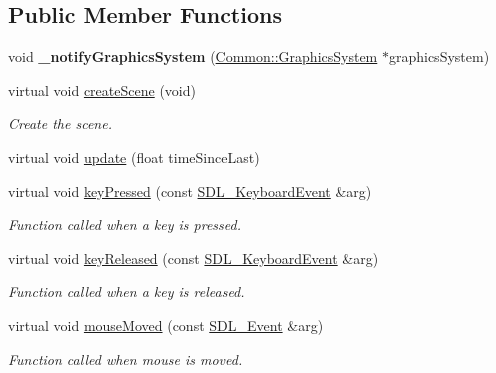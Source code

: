 \subsection*{Public Member Functions}
\begin{DoxyCompactItemize}
\item 
\mbox{\label{class_graphics_game_state_a0e81886306b906569add56b43e8da91d}} 
void {\bfseries \+\_\+notify\+Graphics\+System} (\hyperlink{class_common_1_1_graphics_system}{Common\+::\+Graphics\+System} $\ast$graphics\+System)
\item 
\mbox{\label{class_graphics_game_state_af8e2cd857387dd301edc894bfb8a7ac5}} 
virtual void \hyperlink{class_graphics_game_state_af8e2cd857387dd301edc894bfb8a7ac5}{create\+Scene} (void)
\begin{DoxyCompactList}\small\item\em Create the scene. \end{DoxyCompactList}\item 
virtual void \hyperlink{class_graphics_game_state_a5a2543a4cdd551c98f4540707bc7213e}{update} (float time\+Since\+Last)
\item 
\mbox{\label{class_graphics_game_state_ae7a7e707169e5c0cdbe2f54c8b1be2f6}} 
virtual void \hyperlink{class_graphics_game_state_ae7a7e707169e5c0cdbe2f54c8b1be2f6}{key\+Pressed} (const \hyperlink{struct_s_d_l___keyboard_event}{S\+D\+L\+\_\+\+Keyboard\+Event} \&arg)
\begin{DoxyCompactList}\small\item\em Function called when a key is pressed. \end{DoxyCompactList}\item 
\mbox{\label{class_graphics_game_state_a9a63e8acad9cb3d9e3c389f88e303665}} 
virtual void \hyperlink{class_graphics_game_state_a9a63e8acad9cb3d9e3c389f88e303665}{key\+Released} (const \hyperlink{struct_s_d_l___keyboard_event}{S\+D\+L\+\_\+\+Keyboard\+Event} \&arg)
\begin{DoxyCompactList}\small\item\em Function called when a key is released. \end{DoxyCompactList}\item 
\mbox{\label{class_graphics_game_state_acdf08d6cfd2610be0186047adbda912e}} 
virtual void \hyperlink{class_graphics_game_state_acdf08d6cfd2610be0186047adbda912e}{mouse\+Moved} (const \hyperlink{union_s_d_l___event}{S\+D\+L\+\_\+\+Event} \&arg)
\begin{DoxyCompactList}\small\item\em Function called when mouse is moved. \end{DoxyCompactList}\end{DoxyCompactItemize}
